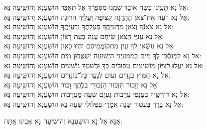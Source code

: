 \documentclass[twoside, openany, parskip=half, 11pt]{book}
\begin{document}
\begin{small}
אֵל נָא תָּעִֽינוּ כְּשֶׂה אוֹבֵד שְׁמֵֽנוּ מִסִּפְרְֿךָ אַל תְּאַבֵּד	\hfill	הוֹשַׁעְנָא וְהוֹשִֽׁיעָה נָּא: \\
אֵל נָא 		רְעֵה אֶת־צֹאן הַהֲרֵגָה קְצוּפָה וְעָלֶֽיךָ הֲרוּגָה 	\hfill	הוֹשַׁעְנָא וְהוֹשִֽׁיעָה נָּא:\\
אֵל נָא 		צֹאנְֿךָ וְצֹאן מַרְעִיתֶֽךָ פְּעֻלָּתְךָ וְרַעְיָתֶֽךָ 	\hfill	הוֹשַׁעְנָא וְהוֹשִֽׁיעָה נָּא:\\
אֵל נָא 		עֲנִיֵּי הַצֹּאן שִׂיחָם עֲנֵה בְּעֵת רָצוֹן 		\hfill	הוֹשַׁעְנָא וְהוֹשִֽׁיעָה נָּא:\\
אֵל נָא 		נוֹשְֿׂאֵי לְךָ עַֽיִן מִתְקוֹמֲמֵֽיהֶם יִהְיוּ כְאַֽיִן 	\hfill	הוֹשַׁעְנָא וְהוֹשִֽׁיעָה נָּא:\\
אֵל נָא 		לִמְנַסְּֿכֵי לְךָ מַֽיִם כְּמִמַּעַיְנֵי הַיְשׁוּעָה יִשְׁאֲבוּן מַֽיִם \hfill 	הוֹשַׁעְנָא וְהוֹשִֽׁיעָה נָּא:\\
אֵל נָא 		יַעֲלוּ לְצִיּוֹן מוֹשִׁיעִים טְפוּלִים בְּךָ וּבְשִׁמְךָ נוֹשָׁעִים \hfill 	הוֹשַׁעְנָא וְהוֹשִֽׁיעָה נָּא:\\
אֵל נָא 		חֲמוּץ בְּגָדִים זְעוֹם לְנַעֵר כָּל־בּוֹגְֿדִים 		\hfill	הוֹשַׁעְנָא וְהוֹשִֽׁיעָה נָּא:\\
אֵל נָא 		וְזָכוֹר תִּזְכּוֹר הַנְּֿכוּרֵי בְּלֶֽתֶךְ וָכוֹר 		\hfill	הוֹשַׁעְנָא וְהוֹשִֽׁיעָה נָּא:\\
אֵל נָא 		דּוֹרְֿשֶֽׁיךָ בְּעַנְפֵי עֲרָבוֹת גַּעְיָם שְׁעֵה מֵעֲרָבוֹת 	\hfill	הוֹשַׁעְנָא וְהוֹשִֽׁיעָה נָּא:\\
אֵל נָא 		בָּרֵךְ בְּעִטּוּר שָׁנָה אֲמָרַי בְּפִלּוּלִי שְׁעֵה נָא 	\hfill	הוֹשַׁעְנָא וְהוֹשִֽׁיעָה נָּא:

\end{small}

\begin{large}
\shatzvkahal
 אָנָּא אֵל נָא הוֹשַׁעְנָא וְהוֹשִֽׁיעָה נָּא אָבִֽינוּ אַֽתָּה:
 
\end{large}
\end{document}
